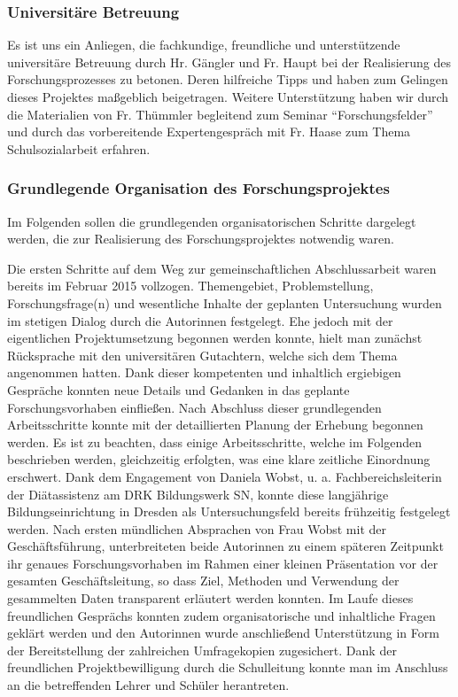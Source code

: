 \subsubsection{Universitäre Betreuung}
\label{sec:UniversitäreBetreuung}

Es ist uns ein Anliegen, die fachkundige, freundliche und unterstützende universitäre Betreuung durch Hr. Gängler und Fr. Haupt bei der Realisierung des Forschungsprozesses zu betonen. Deren hilfreiche Tipps und haben zum Gelingen dieses Projektes maßgeblich beigetragen. Weitere Unterstützung haben wir durch die Materialien von Fr. Thümmler begleitend zum Seminar "`Forschungsfelder"' und durch das vorbereitende Expertengespräch mit Fr. Haase zum Thema Schulsozialarbeit erfahren.

\subsubsection{Grundlegende Organisation des Forschungsprojektes}
\label{sec:GrundlegendeOrganisationDesForschungsprojektes}

Im Folgenden sollen die grundlegenden organisatorischen Schritte dargelegt werden, die zur Realisierung des Forschungsprojektes notwendig waren. 

Die ersten Schritte auf dem Weg zur gemeinschaftlichen Abschlussarbeit waren bereits im Februar 2015 vollzogen. Themengebiet, Problemstellung, Forschungsfrage(n) und wesentliche Inhalte der geplanten Untersuchung wurden im stetigen Dialog durch die Autorinnen festgelegt. Ehe jedoch mit der eigentlichen Projektumsetzung begonnen werden konnte, hielt man zunächst Rücksprache mit den universitären Gutachtern, welche sich dem Thema angenommen hatten. Dank dieser kompetenten und inhaltlich ergiebigen Gespräche konnten neue Details und Gedanken in das geplante Forschungsvorhaben einfließen. Nach Abschluss dieser grundlegenden Arbeitsschritte konnte mit der detaillierten Planung der Erhebung begonnen werden. 
Es ist zu beachten, dass einige Arbeitsschritte, welche im Folgenden beschrieben werden, gleichzeitig erfolgten, was eine klare zeitliche Einordnung erschwert.
Dank dem Engagement von Daniela Wobst, u. a. Fachbereichsleiterin der Diätassistenz am DRK Bildungswerk SN, konnte diese langjährige Bildungseinrichtung in Dresden als Untersuchungsfeld bereits frühzeitig festgelegt werden. Nach ersten mündlichen Absprachen von Frau Wobst mit der Geschäftsführung, unterbreiteten beide Autorinnen zu einem späteren Zeitpunkt ihr genaues Forschungsvorhaben im Rahmen einer kleinen Präsentation vor der gesamten Geschäftsleitung, so dass Ziel, Methoden und Verwendung der gesammelten Daten transparent erläutert werden konnten. Im Laufe dieses freundlichen Gesprächs konnten zudem organisatorische und inhaltliche Fragen geklärt werden und den Autorinnen wurde anschließend Unterstützung in Form der Bereitstellung der zahlreichen Umfragekopien zugesichert. Dank der freundlichen Projektbewilligung durch die Schulleitung konnte man im Anschluss an die betreffenden Lehrer und Schüler herantreten.


